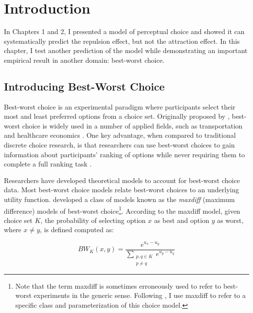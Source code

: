 \section{Introduction}

In Chapters 1 and 2, I presented a model of perceptual choice and showed it can systematically predict the repulsion effect, but not the attraction effect. In this chapter, I test another prediction of the model while demonstrating an important empirical result in another domain: best-worst choice.

\subsection{Introducing Best-Worst Choice}

Best-worst choice is an experimental paradigm where participants select their most and least preferred options from a choice set. Originally proposed by \textcite{finn1992determining}, best-worst choice is widely used in a number of applied fields, such as transportation \parencite{beck2016best} and healthcare economics \parencite{cheung2016using,flynn2007best,muhlbacher2016experimental}. One key advantage, when compared to traditional discrete choice research, is that researchers can use best-worst choices to gain information about participants' ranking of options while never requiring them to complete a full ranking task \parencite{marleyProbabilisticModelsBest2005}.

Researchers have developed theoretical models to account for best-worst choice data. Most best-worst choice models relate best-worst choices to an underlying utility function. \textcite{marleyProbabilisticModelsBest2005} developed a class of models known as the \textit{maxdiff} (maximum difference) models of best-worst choice\footnote{Note that the term maxdiff is sometimes erroneously used to refer to best-worst experiments in the generic sense. Following \textcite{marleyProbabilisticModelsBest2005}, I use maxdiff to refer to a specific class and parameterization of this choice model.}. According to the maxdiff model, given choice set $K$, the probability of selecting option $x$ as best and option $y$ as worst, where $x \neq y$, is defined computed as:

\begin{equation}
   BW_{K}(x,y)=\frac{e^{u_{x}-u_{y}}}{\sum_{\substack{{p,q}\in K\\p \neq q}} e^{u_{p}-u_{q}}}   
   \label{eqn:maxdiff_equation}
\end{equation}

